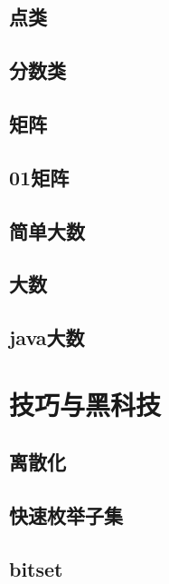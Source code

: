 \section{点类}
\raggedbottom
\hrulefill
\section{分数类}
\raggedbottom
\hrulefill
\section{矩阵}
\raggedbottom
\hrulefill
\section{01矩阵}
\raggedbottom
\hrulefill
\section{简单大数}
\raggedbottom
\hrulefill
\section{大数}
\raggedbottom
\hrulefill
\section{java大数}
\raggedbottom
\hrulefill

\chapter{技巧与黑科技}
\section{离散化}
\raggedbottom
\hrulefill
\section{快速枚举子集}
\raggedbottom
\hrulefill
\section{bitset}
\raggedbottom
\hrulefill
